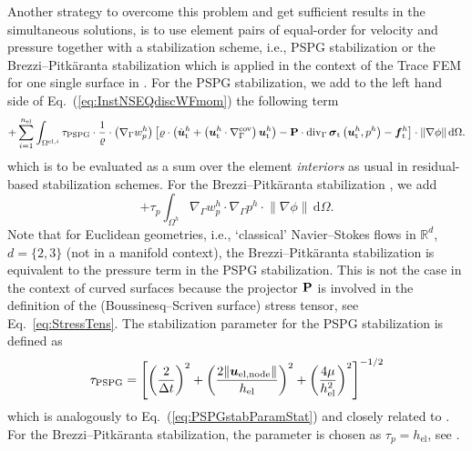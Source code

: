 \documentclass[12pt, twoside, english]{article}
\numberwithin{equation}{section}
\newcommand{\vek}[1]{\mathchoice{\displaystyle\boldsymbol#1}
{\textstyle\boldsymbol#1}{\scriptstyle\boldsymbol#1}
{\scriptscriptstyle\boldsymbol#1}}
\newcommand{\mat}[1]{\mathchoice{\displaystyle\mathbf#1}
{\textstyle\mathbf#1}{\scriptstyle\mathbf#1}
{\scriptscriptstyle\mathbf#1}}
\newcommand{\ti}{ \ensuremath{\mathrm{t} }}
\begin{document}
Another strategy to overcome this problem and get sufficient results in the simultaneous solutions, is to use element pairs of equal-order for velocity and pressure together with a stabilization scheme, i.e., PSPG stabilization \cite{Hughes_1986e} or the Brezzi--Pitkäranta stabilization \cite{Brezzi_1984a} which is applied in the context of the Trace FEM for one single surface in \cite{Olshanskii_2018a}. For the PSPG stabilization, we add to the left hand side of Eq.~(\ref{eq:InstNSEQdiscWFmom}) the following term
\begin{equation}
	+ \sum_{i=1}^{n_{\mathrm{el}}} \int_{\Omega^{\mathrm{el},i}} \tau_{\mathrm{PSPG}} \cdot \frac{1}{\varrho} \cdot \left(\nabla_{\Gamma} w_p^h \right) \left[ \varrho\cdot\left(\dot{\vek{u}}^h_\ti+\left(\vek{u}_\ti^h\cdot\nabla_{\Gamma}^{\mathrm{cov}}\right)\vek{u}_\ti^h\right)-\mat{P}\cdot\mathrm{div}_{\Gamma}\,\vek{\sigma}_\ti\left(\vek{u}^h_\ti,p^h\right)-\vek{f}_\ti^h\right] \cdot \lVert \nabla \phi \rVert\,\mathrm{d}\Omega. \label{eq:PSPGinstatNSEQ}
\end{equation} 
which is to be evaluated as a sum over the element \emph{interiors} as usual in residual-based stabilization schemes. For the Brezzi--Pitkäranta stabilization \cite{Brezzi_1984a,Olshanskii_2018a}, we add
\begin{equation}
	+ \tau_p \int_{\Omega^h} \nabla_{\Gamma} w_p^h \cdot \nabla_{\Gamma} p^h \cdot \lVert \nabla \phi \rVert\,\mathrm{d}\Omega. \label{eq:BrezziPitk}
\end{equation}
Note that for Euclidean geometries, i.e., `classical' Navier--Stokes flows in $\mathbb{R}^d$, $d = \{2,3\}$ (not in a manifold context), the Brezzi--Pitkäranta stabilization is equivalent to the pressure term in the PSPG stabilization. This is not the case in the context of curved surfaces because the projector $\mat{P}$ is involved in the definition of the (Boussinesq--Scriven surface) stress tensor, see Eq.~\ref{eq:StressTens}. The stabilization parameter for the PSPG stabilization is defined as 
\begin{equation}
	\tau_{\mathrm{PSPG}} = \left[\left(\frac{2}{\Delta t}\right)^2 + \left(\frac{2 \lVert \vek{u}_{\mathrm{el,node}}\rVert}{h_\mathrm{el}}\right)^2 + \left(\frac{4\mu}{h_\mathrm{el}^2}\right)^2\right]^{-1/2}
\end{equation}
which is analogously to Eq.~(\ref{eq:PSPGstabParamStat}) and closely related to \cite{Tezduyar_2003a}. For the Brezzi--Pitkäranta stabilization, the parameter is chosen as $\tau_p = h_\mathrm{el}$, see \cite{Olshanskii_2018a}.\\
\end{document}

